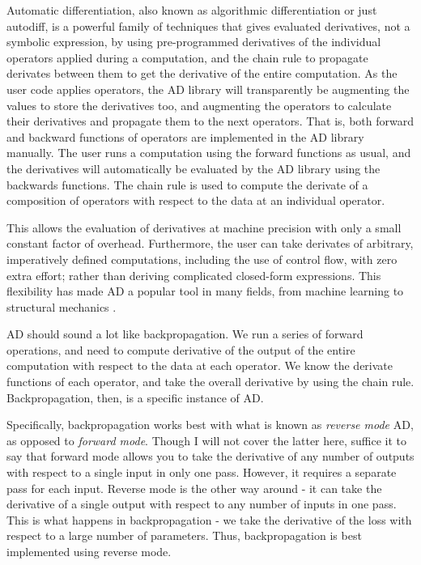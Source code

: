 Automatic differentiation, also known as algorithmic differentiation or just autodiff,
is a powerful family of techniques that gives evaluated derivatives, not a symbolic expression, by using pre-programmed derivatives of the individual operators applied during a computation, and the chain rule to propagate derivates between them to get the derivative of the entire computation.
As the user code applies operators, the AD library will transparently be augmenting the values to store the derivatives too, and augmenting the operators to calculate their derivatives and propagate them to the next operators.
That is, both forward and backward functions of operators are implemented in the AD library manually.
The user runs a computation using the forward functions as usual, and the derivatives will automatically be evaluated by the AD library using the backwards functions.
The chain rule is used to compute the derivate of a composition of operators with respect to the data at an individual operator.

This allows the evaluation of derivatives at machine precision with only a small constant factor of overhead.
Furthermore, the user can take derivates of arbitrary, imperatively defined computations, including the use of control flow, with zero extra effort; rather than deriving complicated closed-form expressions.
This flexibility has made AD a popular tool in many fields, from machine learning to structural mechanics \cite{Haase2002}.

AD should sound a lot like backpropagation.
We run a series of forward operations, and need to compute derivative of the output of the entire computation with respect to the data at each operator. We know the derivate functions of each operator, and take the overall derivative by using the chain rule. Backpropagation, then, is a specific instance of AD.

Specifically, backpropagation works best with what is known as \textit{reverse mode} AD, as opposed to \textit{forward mode}.
Though I will not cover the latter here, suffice it to say that forward mode allows you to take the derivative of any number of outputs with respect to a single input in only one pass.
However, it requires a separate pass for each input.
Reverse mode is the other way around -
it can take the derivative of a single output with respect to any number of inputs in one pass.
This is what happens in backpropagation -
we take the derivative of the loss with respect to a large number of parameters.
Thus, backpropagation is best implemented using reverse mode.

